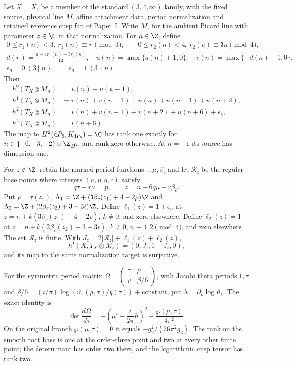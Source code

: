 \hypertarget{main-II-E}{}
\begin{maintheorem}
\hypertarget{tag-03K6}{}\label{series:II:E}
Let $X=X_c$ be a member of the standard $(3,4,\infty)$ family,
with the fixed source, physical line $M$, affine attachment data,
period normalization and retained reference cusp fan of Paper~I.
Write $M_z$ for the ambient Picard line with parameter $z\in\C$
in that normalization. For $n\in\Z$, define
\[
 \begin{gathered}
 0\le r_1(n)<3,\ r_1(n)\equiv n\pmod3,\qquad
 0\le r_2(n)<4,\ r_2(n)\equiv3n\pmod4,\\
 d(n)=\frac{n-4r_1(n)-3r_2(n)}{12},\quad
 u(n)=\max\{d(n)+1,0\},\quad v(n)=\max\{-d(n)-1,0\},\\
 \epsilon_n=0\ (3\mid n),\qquad \epsilon_n=1\ (3\nmid n).
 \end{gathered}
\]
Then
\[
\begin{aligned}
 h^0(T_X\otimes M_n)&=u(n)+u(n-1),\\
 h^1(T_X\otimes M_n)&=v(n)+v(n-1)+u(n)+u(n-1)+u(n+2),\\
 h^2(T_X\otimes M_n)&=v(n)+v(n-1)+v(n+2)+u(n+6)+\epsilon_n,\\
 h^3(T_X\otimes M_n)&=v(n+6).
\end{aligned}
\]
The map to $H^2(\mathrm dP_6,K_{\mathrm dP_6})=\C$ has rank one
exactly for $n\in\{-6,-3,-2\}\cup\Z_{\ge0}$, and rank zero
otherwise. At $n=-1$ its source has dimension one.

For $z\notin\Z$, retain the marked period functions
$\tau,\mu,\beta_c$ and let $\mathcal R_z$ be the regular base
points where integers $(n,p,q,r)$ satisfy
\[
 q\tau+r\mu=p,\qquad z=n-6q\mu-r\beta_c.
\]
Put $\rho=\tau(z_1)$,
$\Lambda_1=\Z+(3\beta_c(z_1)+4-2\rho)\Z$ and
$\Lambda_2=\Z+(2\beta_c(z_2)+3-3i)\Z$.
Define $\ell_1(z)=1+\epsilon_n$ at
$z=n+k(3\beta_c(z_1)+4-2\rho)$, $k\ne0$, and zero elsewhere.
Define $\ell_2(z)=1$ at
$z=n+k(2\beta_c(z_2)+3-3i)$, $k\ne0$,
$n\equiv1,2\pmod4$, and zero elsewhere. The set $\mathcal R_z$
is finite. With $J_z=2|\mathcal R_z|+\ell_1(z)+\ell_2(z)$,
\[
 h^\bullet(X,T_X\otimes M_z)=(0,J_z,1+J_z,0),
\]
and its map to the same normalization target is surjective.

For the symmetric period matrix
$\Omega=\left(\begin{smallmatrix}\tau&\mu\\\mu&\beta/6\end{smallmatrix}\right)$,
with Jacobi theta periods $1,\tau$ and
$\beta/6=(i/\pi)\log(\vartheta_1(\mu,\tau)/\eta(\tau))+\mathrm{constant}$,
put $h=\partial_\mu\log\vartheta_1$. The exact identity is
\[
 \det\frac{d\Omega}{d\tau}
 =-\left(\mu'-\frac{i}{2\pi}h\right)^2
   -\frac{\wp(\mu,\tau)}{4\pi^2}.
\]
On the original branch $\wp(\mu,\tau)=0$ it equals
$-g_2^2/(36\pi^2g_3)$. The rank on the smooth root base is one
at the order-three point and two at every other finite point;
the determinant has order two there, and the logarithmic cusp
tensor has rank two.

\end{maintheorem}

